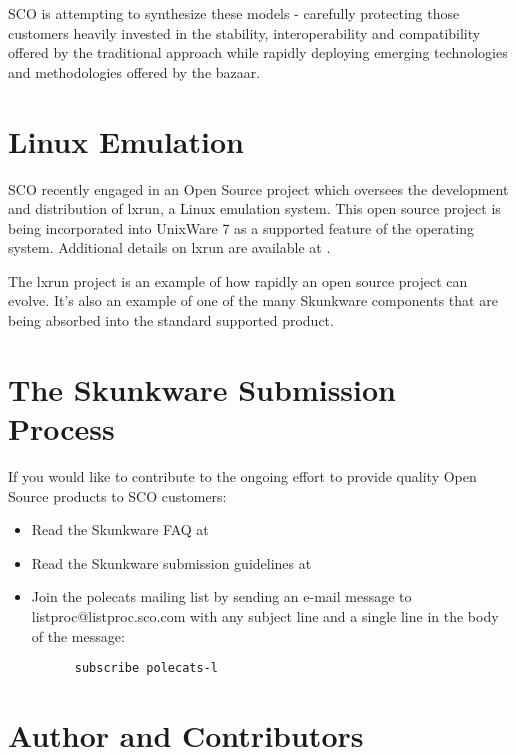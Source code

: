 \documentclass[letterpaper]{article}
\begin{document}
SCO is attempting to synthesize these models - carefully protecting
those customers heavily invested in the stability, interoperability
and compatibility offered by the traditional approach while rapidly
deploying emerging technologies and methodologies offered by the bazaar.




\section{Linux Emulation}

SCO recently engaged in an Open Source project which oversees the development
and distribution of lxrun, a Linux emulation system. This open source project
is being incorporated into UnixWare 7 as a supported feature of the operating
system. Additional details on lxrun are available at
.

The lxrun project is an example of how rapidly an open source project can
evolve. It's also an example of one of the many Skunkware components that
are being absorbed into the standard supported product. 




\section{The Skunkware Submission Process}

If you would like to contribute to the ongoing effort to provide quality
Open Source products to SCO customers:
\begin{itemize}
\item Read the Skunkware FAQ at 
\item Read the Skunkware submission guidelines at 
\item Join the polecats mailing list by sending an e-mail message 
to listproc@listproc.sco.com with any subject line and a single line 
in the body of the message:
\begin{tscreen}
\begin{verbatim}
      subscribe polecats-l
\end{verbatim}
\end{tscreen}
\end{itemize}





\section{Author and Contributors}
\end{document}
